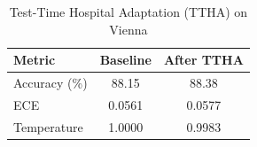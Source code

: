 \begin{table}[h]
\centering
\caption{Test-Time Hospital Adaptation (TTHA) on Vienna}
\begin{tabular}{lcc}
\toprule
Metric & Baseline & After TTHA \\
\midrule
Accuracy (\%) & 88.15 & 88.38 \\
ECE & 0.0561 & 0.0577 \\
Temperature & 1.0000 & 0.9983 \\
\bottomrule
\end{tabular}
\label{tab:ttha}
\end{table}
